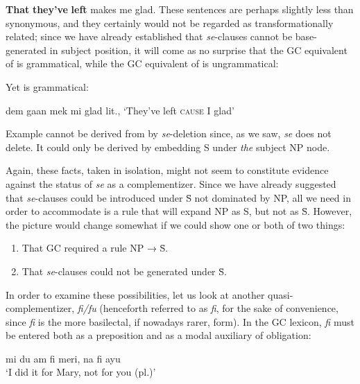 \ea\label{ex:2:182}
\textbf{That} \textbf{they've} \textbf{left} makes me glad.
\z
These sentences are perhaps slightly less than synonymous, and they certainly would not be regarded as transformationally related; since we have already established that \textit{se}-clauses cannot be base-generated in subject position, it will come as no surprise that the GC equivalent of  is grammatical, while the GC equivalent of  is ungrammatical:

\z

\z

\noindent Yet  is grammatical:

\ea\label{ex:2:185}
 dem gaan mek mi glad
\glt  lit., `They've left \textsc{cause} I glad'
\z

Example  cannot be derived from  by \textit{se}-deletion since, as we saw, \textit{se} does not delete. It could only be derived by embedding S under \textit{the} subject NP node.

Again, these facts, taken in isolation, might not seem to con\-stitute evidence against the status of \textit{se} as a complementizer. Since we have already suggested that \textit{se}-clauses could be introduced under \=S not dominated by NP, all we need in order to accommodate  is a rule that will expand NP as S, but not as \=S. However, the picture would change somewhat if we could show one or both of two things:

\begin{enumerate}
\item That GC required a rule NP → \=S. \label{GCrequirementcondition}
\item That \textit{se}-clauses could not be generated under \=S. \label{GCrequirementcondition2}
\end{enumerate}

In order to examine these possibilities, let us look at another quasi-
complementizer, \textit{fi/fu} (henceforth referred to as \textit{fi}, for the sake of convenience, since \textit{fi} is the more basilectal, if nowadays rarer, form). In the GC lexicon, \textit{fi} must be entered both as a preposition and as a modal auxiliary of obligation:

\ea\label{ex:2:186}
mi du am fi meri, na fi ayu\\
\glt `I did it for Mary, not for you (pl.)'
\z

